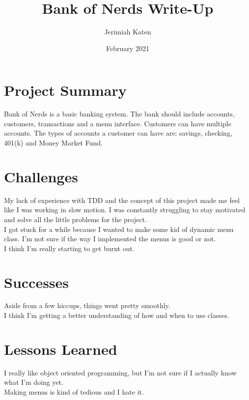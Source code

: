 \documentclass{article}
\title{Bank of Nerds Write-Up}
\author{Jerimiah Katen}
\date{February 2021}
\begin{document}
\maketitle

\section{Project Summary}

Bank of Nerds is a basic banking system. The bank should include accounts, customers, transactions and a menu interface. Customers can have multiple accounts. The types of accounts a customer can have are; savings, checking, 401(k) and Money Market Fund.


\section{Challenges}

My lack of experience with TDD and the concept of this project made me feel like I was working in slow motion. I was constantly struggling to stay motivated and solve all the little problems for the project.
\\[.5cm]
I got stuck for a while because I wanted to make some kid of dynamic menu class. I'm not sure if the way I implemented the menus is good or not.
\\[.5cm]
I think I'm really starting to get burnt out.


\section{Successes}
Aside from a few hiccups, things went pretty smoothly.
\\[.5cm]
I think I'm getting a better understanding of how and when to use classes.


\section{Lessons Learned}
I really like object oriented programming, but I'm not sure if I actually know what I'm doing yet.
\\[.5cm]
Making menus is kind of tedious and I hate it.
\end{document}
